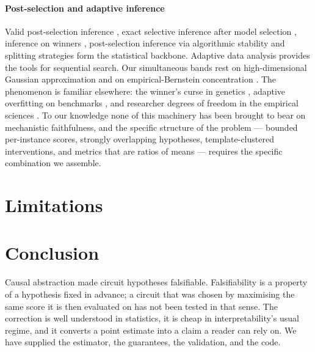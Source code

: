 \paragraph{Post-selection and adaptive inference}
Valid post-selection inference \citep{berk2013valid}, exact selective inference
after model selection \citep{lee2016exact,fithian2014optimal,tibshirani2016exact,
tian2018selective}, inference on winners \citep{andrews2024inference},
post-selection inference via algorithmic stability \citep{zrnic2023post} and
splitting strategies \citep{garciarasines2023splitting,leiner2025fission} form the
statistical backbone. Adaptive data analysis
\citep{dwork2015preserving,dwork2015reusable,blum2015ladder,bassily2016algorithmic,
russo2016controlling,feldman2017generalization} provides the tools for sequential
search. Our simultaneous bands rest on high-dimensional Gaussian approximation
\citep{chernozhukov2013gaussian,chernozhukov2017central,chernozhukov2016empirical}
and on empirical-Bernstein concentration \citep{maurer2009empirical,audibert2009exploration}.
The phenomenon is familiar elsewhere: the winner's curse in genetics
\citep{zollner2007winners}, adaptive overfitting on benchmarks
\citep{recht2019imagenet,roelofs2019metaanalysis}, and researcher degrees of
freedom in the empirical sciences \citep{simmons2011false,gelman2013garden,ioannidis2005why}.
To our knowledge none of this machinery has been brought to bear on mechanistic
faithfulness, and the specific structure of the problem --- bounded per-instance
scores, strongly overlapping hypotheses, template-clustered interventions, and
metrics that are ratios of means --- requires the specific combination we assemble.

\section{Limitations}
\label{sec:limitations}



\section{Conclusion}

Causal abstraction made circuit hypotheses falsifiable. Falsifiability is a
property of a hypothesis fixed in advance; a circuit that was chosen by
maximising the same score it is then evaluated on has not been tested in that
sense. The correction is well understood in statistics, it is cheap in
interpretability's usual regime, and it converts a point estimate into a claim a
reader can rely on. We have supplied the estimator, the guarantees, the
validation, and the code.

